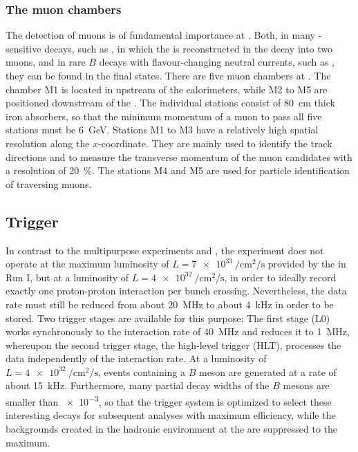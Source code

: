 \subsubsection*{The muon chambers}
\label{sec:muonchambers}

The detection of muons is of fundamental importance at \lhcb.
Both, in many \CP-sensitive decays, such as \BdToJPsiKS, in which the \jpsi is reconstructed in the decay into two muons, and in rare $B$ decays with flavour-changing neutral currents, such as \Bsmm, they can be found in the final states.
There are five muon chambers at \lhcb.
The chamber M1 is located in upstream of the calorimeters, while M2 to M5 are positioned downstream of the \hcal.
The individual stations consist of \SI{80}{\centi\metre} thick iron absorbers, so that the minimum momentum of a muon to pass all five stations must be \SI{6}{\giga\electronvolt}.
Stations M1 to M3 have a relatively high spatial resolution along the $x$-coordinate.
They are mainly used to identify the track directions and to measure the transverse momentum \pt of the muon candidates with a resolution of \SI{20}{\percent}.
The stations M4 and M5 are used for particle identification of traversing muons.

\subsection{Trigger}
\label{sec:trigger}

In contrast to the multipurpose experiments \atlas and \cms, the \lhcb experiment does not operate at the maximum luminosity of $L=\SI{7e33}{\per\centi\metre\squared\per\second}$ provided by the \lhc in Run I, but at a luminosity of $L=\SI{4e32}{\per\centi\metre\squared\per\second}$, in order to ideally record exactly one proton-proton interaction per bunch crossing.
Nevertheless, the data rate must still be reduced from about \SI{20}{\mega\hertz} to about \SI{4}{\kilo\hertz} in order to be stored.
Two trigger stages are available for this purpose: The first stage (L0) works synchronously to the interaction rate of \SI{40}{\mega\hertz} and reduces it to \SI{1}{\mega\hertz}, whereupon the second trigger stage, the high-level trigger (HLT), processes the data independently of the interaction rate.
At a luminosity of $L=\SI{4e32}{\per\centi\metre\squared\per\second}$, events containing a $B$ meson are generated at a rate of about \SI{15}{\kilo\hertz}.
Furthermore, many partial decay widths of the $B$ mesons are smaller than \num{e-3}, so that the trigger system is optimized to select these interesting decays for subsequent analyses with maximum efficiency, while the backgrounds created in the hadronic environment at the \lhc are suppressed to the maximum.

